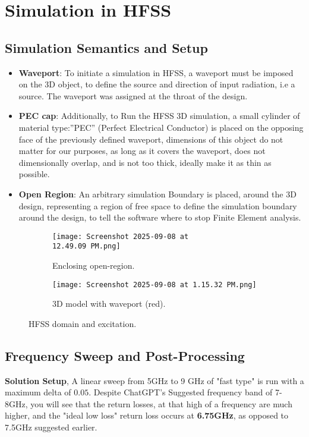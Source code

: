 \documentclass[11pt]{article}
\begin{document}
\section{Simulation in HFSS}
\subsection{Simulation Semantics and Setup}
\begin{itemize}
  \item \textbf{Waveport}: To initiate a simulation in HFSS, a waveport must be imposed on the 3D object, to define the source and direction of input radiation, i.e a source. The waveport was assigned at the throat of the design.
  \item \textbf{PEC cap}: Additionally, to Run the HFSS 3D simulation, a small cylinder of material type:”PEC”
(Perfect Electrical Conductor) is placed on the opposing face of the previously defined waveport,
dimensions of this object do not matter for our purposes, as long as it covers the waveport, does
not dimensionally overlap, and is not too thick, ideally make it as thin as possible.
  \item \textbf{Open Region}: An arbitrary simulation Boundary is placed, around the 3D design, representing a region of free space to define the simulation boundary around the design, to tell the software where to stop Finite Element analysis.
\end{itemize}
\begin{figure}[H]
  \centering
  \begin{subfigure}[b]{0.48\textwidth}
    \centering
    \texttt{[image: Screenshot 2025-09-08 at 12.49.09 PM.png]}
    \caption{Enclosing open-region.}
    \label{fig:open_region}
  \end{subfigure}\hfill
  \begin{subfigure}[b]{0.48\textwidth}
    \centering
    \texttt{[image: Screenshot 2025-09-08 at 1.15.32 PM.png]}
    \caption{3D model with waveport (red).}
    \label{fig:waveport}
  \end{subfigure}
  \caption{HFSS domain and excitation.}
\end{figure}

\subsection{Frequency Sweep and Post-Processing}
\textbf{Solution Setup}, A linear sweep from 5GHz to 9 GHz of "fast type" is run with a maximum delta of $0.05$. Despite ChatGPT's Suggested frequency band of 7-8GHz, you will see that the return losses, at that high of a frequency are much higher, and the "ideal low loss" return loss occurs at \textbf{6.75GHz}, as opposed to 7.5GHz suggested earlier.
\end{document}
